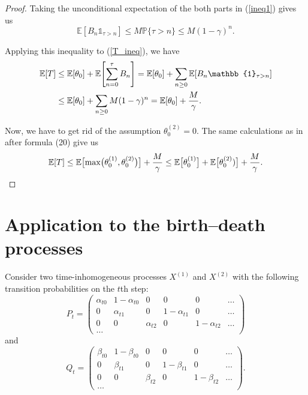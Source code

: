 \documentclass[numbers,compress,v1.0.1]{vmsta}
\newcommand{\lsum}{\sum\limits}
\theoremstyle{definition}
\newcommand{\lleft}{\left}
\newcommand{\rright}{\right}
\begin{document}
\begin{proof}
Taking the unconditional expectation of the both parts in (\ref{ineq1})
gives us
%
\begin{equation}
\mathbb{E}[B_n \mathbb{1}_{\tau> n}] \le M \mathbb{P}\{\tau> n
\} \le M (1-\gamma)^{n}.
\end{equation}

Applying this inequality to (\ref{T_ineq}), we have
%
\begin{align}
\mathbb{E}[T] & \le\mathbb{E}[\theta_0] + \mathbb{E}\Biggl[\sum_{n=0}^\tau B_n\Biggr] = \mathbb{E}[\theta_0] + \sum_{n\ge0} \mathbb{E}[B_n \mathbb{1}_{\tau> n}] \notag\\
&\le\mathbb{E}[\theta_0] + \lsum_{n\ge0} M (1-\gamma)^n = \mathbb{E}[\theta_0] + \frac{M}{\gamma}.\label{T_ineq2}
\end{align}

Now, we have to get rid of the assumption $\theta^{(2)}_0=0$. The same
calculations as in \cite{Coupling} after formula (20) give us
%
\[
\mathbb{E}[T] \le\mathbb{E}\bigl[\max\bigl(\theta^{(1)}_0,
\theta^{(2)}_0\bigr)\bigr] + \frac{M}{\gamma} \le\mathbb{E}
\bigl[\theta^{(1)}_0\bigr] + \mathbb{E}\bigl[\theta
^{(2)}_0)\bigr] + \frac{M}{\gamma}.\qedhere
\]
\end{proof}

\section{Application to the birth--death processes}
Consider two time-inhomogeneous processes $X^{(1)}$ and $X^{(2)}$ with
the following transition probabilities on the $t$th step:
%
\begin{equation}
P_{t} = \lleft( %
\begin{array}{cccccc}
\alpha_{t0}& 1-\alpha_{t0}& 0& 0& 0&\ldots\\
0& \alpha_{t1}& 0& 1-\alpha_{t1}& 0& \ldots\\
0& 0& \alpha_{t2}& 0& 1-\alpha_{t2}& \ldots\\
\ldots
\end{array} %
 \rright)
\end{equation}
%
and
%
\begin{equation}
Q_{t} = \lleft( %
\begin{array}{cccccc}
\beta_{t0}& 1-\beta_{t0}& 0& 0& 0&\ldots\\
0& \beta_{t1}& 0& 1-\beta_{t1}& 0& \ldots\\
0& 0& \beta_{t2}& 0& 1-\beta_{t2}& \ldots\\
\ldots
\end{array} %
 \rright).
\end{equation}
\end{document}
